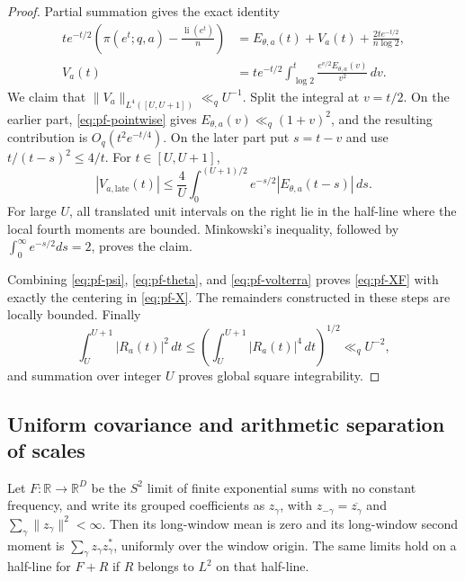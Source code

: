 \begin{proof}
Partial summation gives the exact identity
\begin{align}
\label{eq:pf-volterra}
 t e^{-t/2}\left(\pi(e^t;q,a)-\frac{\operatorname{li}(e^t)}n\right)
 &=E_{\theta,a}(t)+V_a(t)+\frac{2t e^{-t/2}}{n\log2},\\
 V_a(t)&=t e^{-t/2}\int_{\log2}^t
                    \frac{e^{v/2}E_{\theta,a}(v)}{v^2}\,dv.
 \nonumber
\end{align}
We claim that $\|V_a\|_{L^4([U,U+1])}\ll_q U^{-1}$.
Split the integral at $v=t/2$.  On the earlier part,
\eqref{eq:pf-pointwise} gives $E_{\theta,a}(v)\ll_q(1+v)^2$, and the
resulting contribution is $O_q(t^2e^{-t/4})$.  On the later part put
$s=t-v$ and use $t/(t-s)^2\leq4/t$.  For $t\in[U,U+1]$,
\[
 |V_{a,\mathrm{late}}(t)|
 \leq\frac4U\int_0^{(U+1)/2}e^{-s/2}|E_{\theta,a}(t-s)|\,ds.
\]
For large $U$, all translated unit intervals on the right lie in the
half-line where the local fourth moments are bounded.  Minkowski's
inequality, followed by $\int_0^\infty e^{-s/2}ds=2$, proves the claim.

Combining \eqref{eq:pf-psi}, \eqref{eq:pf-theta}, and
\eqref{eq:pf-volterra} proves \eqref{eq:pf-XF} with exactly the
centering in \eqref{eq:pf-X}.  The remainders constructed in these
steps are locally bounded.  Finally
\[
 \int_U^{U+1}|R_a(t)|^2\,dt
       \leq\left(\int_U^{U+1}|R_a(t)|^4\,dt\right)^{1/2}
       \ll_q U^{-2},
\]
and summation over integer $U$ proves global square integrability.
\end{proof}

\subsection{Uniform covariance and arithmetic separation of scales}
\label{subsec:pf-covariance}

\begin{lemma}
\label{lem:pf-moments}
Let $F:\mathbb R\to\mathbb R^D$ be the $S^2$ limit of finite
exponential sums with no constant frequency, and write its grouped
coefficients as $z_\gamma$, with
$z_{-\gamma}=\overline{z_\gamma}$ and $\sum_\gamma\|z_\gamma\|^2<\infty$.
Then its long-window mean is zero and its long-window second moment is
$\sum_\gamma z_\gamma z_\gamma^*$, uniformly over the window origin.
The same limits hold on a half-line for $F+R$ if $R$ belongs to $L^2$
on that half-line.
\end{lemma}

